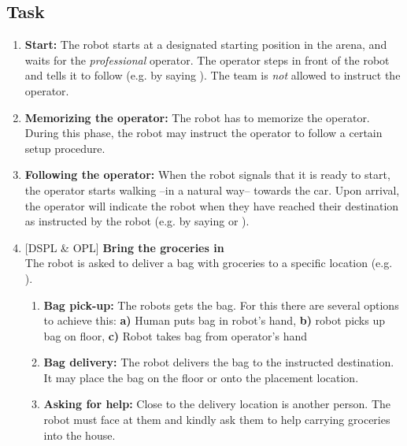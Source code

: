 \subsection{Task}
\begin{enumerate}
  \item \textbf{Start:} The robot starts at a designated starting position in the arena, and waits for the \textit{professional} operator. The operator steps in front of the robot and tells it to follow (e.g. by saying ). The team is \emph{not} allowed to instruct the operator.

  \item \textbf{Memorizing the operator:} The robot has to memorize the operator. During this phase, the robot may instruct the operator to follow a certain setup procedure.

  \item \textbf{Following the operator:} When the robot signals that it is ready to start, the operator starts walking --in a natural way-- towards the car. Upon arrival, the operator will indicate the robot when they have reached their destination as instructed by the robot (e.g. by saying  or ).

  \setcounter{enumTemp}{\theenumi}
  \item {[DSPL \& OPL]} \textbf{Bring the groceries in} \\
  The robot is asked to deliver a bag with groceries  to a specific location (e.g. ).
  \begin{enumerate}
    \item \textbf{Bag pick-up:} The robots gets the bag. For this there are several options to achieve this: 
      \textbf{a)} Human puts bag in robot's hand, 
      \textbf{b)} robot picks up bag on floor,
      \textbf{c)} Robot takes bag from operator's hand
    \item \textbf{Bag delivery:} The robot delivers the bag to the instructed destination. It may place the bag on the floor or onto the placement location.\\

    \item \textbf{Asking for help:} Close to the delivery location is another person. The robot must face at them and kindly ask them to help carrying groceries into the house.
  \end{enumerate}


\end{enumerate}
